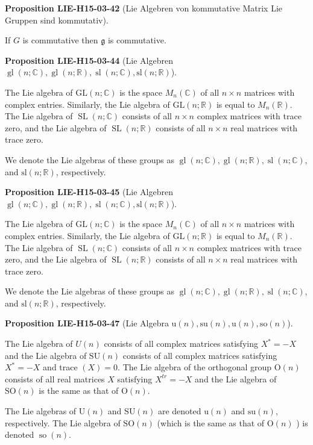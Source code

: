 \documentclass[10pt, letterpaper]{article}
\newcommand{\CustomHeading}[3]{%
  \par\medskip\noindent%
  \textbf{#1 #2} \textnormal{(#3)}.\enskip%
}
\newenvironment{PROP}[2]{\CustomHeading{Proposition}{#1}{#2}}{}
\begin{document}
\begin{PROP}{LIE-H15-03-42}{Lie Algebren von kommutative Matrix Lie Gruppen sind kommutativ}
If $G$ is commutative then $\mathfrak{g}$ is commutative.
\end{PROP}

\begin{PROP}{LIE-H15-03-44}{Lie Algebren $\operatorname{gl}(n ; \mathbb{C}), \operatorname{gl}(n ; \mathbb{R}), \operatorname{sl}(n ; \mathbb{C}), \mathrm{sl}(n ; \mathbb{R})$}
The Lie algebra of $\mathrm{GL}(n ; \mathbb{C})$ is the space $M_{n}(\mathbb{C})$ of all $n \times n$ matrices with complex entries. Similarly, the Lie algebra of $\mathrm{GL}(n ; \mathbb{R})$ is equal to $M_{n}(\mathbb{R})$. The Lie algebra of $\operatorname{SL}(n ; \mathbb{C})$ consists of all $n \times n$ complex matrices with trace zero, and the Lie algebra of $\operatorname{SL}(n ; \mathbb{R})$ consists of all $n \times n$ real matrices with trace zero.

We denote the Lie algebras of these groups as $\operatorname{gl}(n ; \mathbb{C}), \operatorname{gl}(n ; \mathbb{R}), \operatorname{sl}(n ; \mathbb{C})$, and $\mathrm{sl}(n ; \mathbb{R})$, respectively.
\end{PROP}

\begin{PROP}{LIE-H15-03-45}{Lie Algebren $\operatorname{gl}(n ; \mathbb{C}), \operatorname{gl}(n ; \mathbb{R}), \operatorname{sl}(n ; \mathbb{C}), \mathrm{sl}(n ; \mathbb{R})$}
The Lie algebra of $\mathrm{GL}(n ; \mathbb{C})$ is the space $M_{n}(\mathbb{C})$ of all $n \times n$ matrices with complex entries. Similarly, the Lie algebra of $\mathrm{GL}(n ; \mathbb{R})$ is equal to $M_{n}(\mathbb{R})$. The Lie algebra of $\operatorname{SL}(n ; \mathbb{C})$ consists of all $n \times n$ complex matrices with trace zero, and the Lie algebra of $\operatorname{SL}(n ; \mathbb{R})$ consists of all $n \times n$ real matrices with trace zero.

We denote the Lie algebras of these groups as $\operatorname{gl}(n ; \mathbb{C}), \operatorname{gl}(n ; \mathbb{R}), \operatorname{sl}(n ; \mathbb{C})$, and $\mathrm{sl}(n ; \mathbb{R})$, respectively.
\end{PROP}

\begin{PROP}{LIE-H15-03-47}{Lie Algebra $\mathrm{u}(n),\mathrm{su}(n),\mathrm{u}(n),\mathrm{so}(n)$}
The Lie algebra of $U(n)$ consists of all complex matrices satisfying $X^{*}=-X$ and the Lie algebra of $\mathrm{SU}(n)$ consists of all complex matrices satisfying $X^{*}=-X$ and trace $(X)=0$. The Lie algebra of the orthogonal group $\mathrm{O}(n)$ consists of all real matrices $X$ satisfying $X^{t r}=-X$ and the Lie algebra of $\mathrm{SO}(n)$ is the same as that of $\mathrm{O}(n)$.

The Lie algebras of $\mathrm{U}(n)$ and $\mathrm{SU}(n)$ are denoted $\mathrm{u}(n)$ and $\mathrm{su}(n)$, respectively. The Lie algebra of $\mathrm{SO}(n)$ (which is the same as that of $\mathrm{O}(n)$ ) is denoted $\operatorname{so}(n)$.
\end{PROP}
\end{document}
